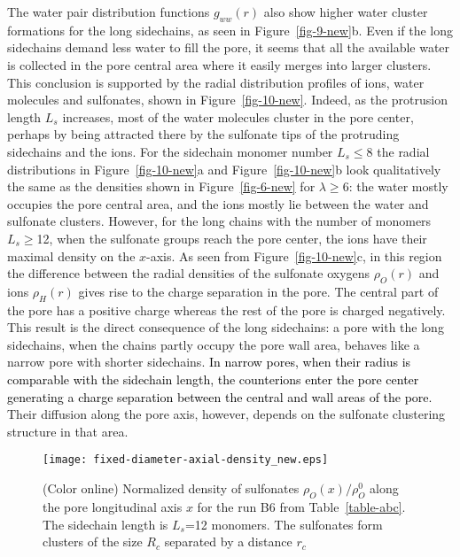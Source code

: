 \documentclass[3p,english,preprint]{elsarticle}
\newcommand{\need}[1]{\textcolor{black}{#1}}
\newcommand{\mage}[1]{\textcolor{black}{#1}}
\begin{document}
The water pair distribution functions $g_{ww}(r)$ also show higher water cluster 
formations for the long sidechains, as seen in  Figure~\ref{fig-9-new}b.  
Even if the long sidechains  demand less  water to fill the pore,  
it seems that all the available water is collected in the  
pore central area where it  easily  merges into larger clusters. 
This conclusion is supported by  %
the radial distribution profiles of ions, water molecules and 
sulfonates, shown in Figure~\ref{fig-10-new}. 
Indeed, as the  protrusion length $L_s$ increases, 
 most of the water molecules cluster in the pore center, 
perhaps by being attracted there by the sulfonate tips of the protruding  
sidechains and the ions. 
For the sidechain monomer number $L_s\leq$8 the radial distributions in 
 Figure~\ref{fig-10-new}a and Figure~\ref{fig-10-new}b 
  look qualitatively  the same as the densities 
shown in Figure~\ref{fig-6-new} for
$\lambda$$\geq$6: the water mostly occupies the pore central area, and the 
ions mostly lie between the water and sulfonate clusters. 
However, for the long chains with the number of monomers   $L_s\geq$12, when the 
sulfonate groups reach the pore center, the ions have their maximal density 
on the $x$-axis. 
 As seen from  Figure~\ref{fig-10-new}c, in this region 
the difference between the radial densities of the sulfonate oxygens $\rho_O(r)$ and 
ions $\rho_H(r)$ gives rise to the charge separation in the pore. 
The central part of the pore  has a positive charge whereas the rest of the pore is charged 
negatively. 
This result is the direct consequence of
the  long sidechains:  a pore with the long sidechains, when the 
chains partly occupy the pore wall area, 
behaves like a narrow pore with shorter sidechains.
{\need{ 
 In narrow pores, when 
their radius is comparable with the sidechain length, 
the counterions enter the pore center 
generating a charge separation between the central  and  wall areas of the pore.
}} 
Their diffusion along the pore axis, however, depends on 
the sulfonate clustering structure in that area. 


\begin{figure}[!ht]
\begin{center}
\texttt{[image: fixed-diameter-axial-density\_new.eps]}
\end{center}
\vspace{-0.7cm}
\caption{(Color online)  Normalized density of sulfonates 
$\rho_O(x)/\rho_O^0$ along the pore longitudinal axis $x$ for 
the run B6  from 
Table~\ref{table-abc}. The sidechain length is 
  $L_s$=12 monomers. The sulfonates form clusters of the size $R_c$ separated by a distance 
  $r_c$ \label{fig-11-new}
}
\end{figure}
\end{document}
